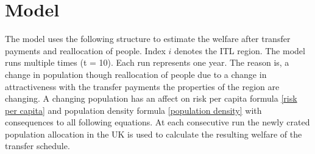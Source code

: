 \documentclass[10pt,a4paper]{article}
\begin{document}
\section{Model}

The model uses the following structure to estimate the welfare after transfer payments and reallocation of people. Index $i$ denotes the ITL region.
The model runs multiple times (t = 10). Each run represents one year. The reason is, a change in population though reallocation of people due to a change in attractiveness with the transfer payments the properties of the region are changing. A changing population has an affect on risk per capita formula \ref{risk per capita} and population density formula \ref{population density} with consequences to all following equations. At each consecutive run the newly crated population allocation in the UK is used to calculate the resulting welfare of the transfer schedule.
\newline
\end{document}

